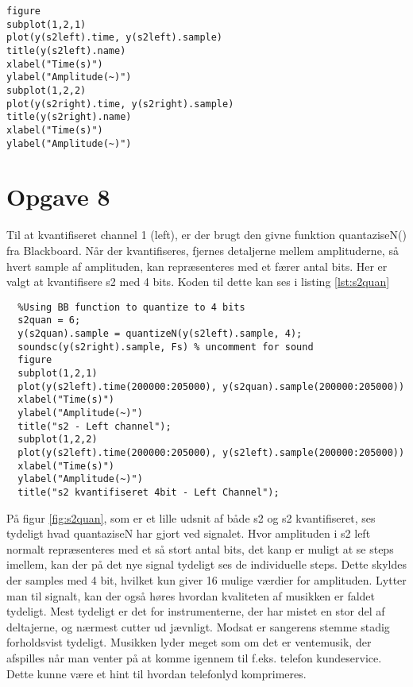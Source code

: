 \documentclass[../main.tex]{subfiles}
\begin{document}
\begin{lstlisting}[caption={Kode for plot af s2left og s2 right}, label=lst:s2]
figure
subplot(1,2,1)
plot(y(s2left).time, y(s2left).sample)
title(y(s2left).name)
xlabel("Time(s)")
ylabel("Amplitude(~)")
subplot(1,2,2)
plot(y(s2right).time, y(s2right).sample)
title(y(s2right).name)
xlabel("Time(s)")
ylabel("Amplitude(~)")
\end{lstlisting}



\section*{Opgave 8}

Til at kvantifiseret channel 1 (left), er der brugt den givne funktion quantaziseN() fra Blackboard. Når der kvantifiseres, fjernes detaljerne mellem amplituderne, så hvert sample af amplituden, kan repræsenteres med et færer antal bits. Her er valgt at kvantifisere s2 med 4 bits. Koden til dette kan ses i listing \ref{lst:s2quan}

\begin{lstlisting}[caption={Kvantifisering af s2}, label=lst:s2quan]
  %% Exercise 8
  %Using BB function to quantize to 4 bits
  s2quan = 6;
  y(s2quan).sample = quantizeN(y(s2left).sample, 4);
  soundsc(y(s2right).sample, Fs) % uncomment for sound
  figure
  subplot(1,2,1)
  plot(y(s2left).time(200000:205000), y(s2quan).sample(200000:205000))
  xlabel("Time(s)")
  ylabel("Amplitude(~)")
  title("s2 - Left channel");
  subplot(1,2,2)
  plot(y(s2left).time(200000:205000), y(s2left).sample(200000:205000))
  xlabel("Time(s)")
  ylabel("Amplitude(~)")
  title("s2 kvantifiseret 4bit - Left Channel");
\end{lstlisting}


På figur \ref{fig:s2quan}, som er et lille udsnit af både s2 og s2 kvantifiseret, ses tydeligt hvad quantaziseN har gjort ved signalet. Hvor amplituden i s2 left normalt repræsenteres med et så stort antal bits, det kanp er muligt at se steps imellem, kan der på det nye signal tydeligt ses de individuelle steps. Dette skyldes der samples med 4 bit, hvilket kun giver 16 mulige værdier for amplituden. Lytter man til signalt, kan der også høres hvordan kvaliteten af musikken er faldet tydeligt. Mest tydeligt er det for instrumenterne, der har mistet en stor del af deltajerne, og nærmest cutter ud jævnligt. Modsat er sangerens stemme stadig forholdsvist tydeligt. Musikken lyder meget som om det er ventemusik, der afspilles når man venter på at komme igennem til f.eks.  telefon kundeservice. Dette kunne være et hint til hvordan telefonlyd komprimeres.
\end{document}
